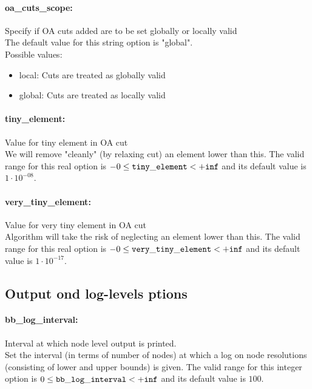 \paragraph{oa\_cuts\_scope:} Specify if OA cuts added are to be set globally or locally valid $\;$ \\

The default value for this string option is "global".
\\ 
Possible values:
\begin{itemize}
   \item local: Cuts are treated as globally valid
   \item global: Cuts are treated as locally valid
\end{itemize}

\paragraph{tiny\_element:} Value for tiny element in OA cut $\;$ \\
 We will remove "cleanly" (by relaxing cut) an
element lower than this. The valid range for this real option is 
$-0 \le {\tt tiny\_element } <  {\tt +inf}$
and its default value is $1 \cdot 10^{-08}$.


\paragraph{very\_tiny\_element:} Value for very tiny element in OA cut $\;$ \\
 Algorithm will take the risk of neglecting an
element lower than this. The valid range for this real option is 
$-0 \le {\tt very\_tiny\_element } <  {\tt +inf}$
and its default value is $1 \cdot 10^{-17}$.


\subsection{Output ond log-levels ptions}
\label{sec:Output_ond_log-levels_ptions}
\paragraph{bb\_log\_interval:} Interval at which node level output is printed. $\;$ \\
 Set the interval (in terms of number of nodes) at
which a log on node resolutions (consisting of
lower and upper bounds) is given. The valid range for this integer option is
$0 \le {\tt bb\_log\_interval } <  {\tt +inf}$
and its default value is $100$.


